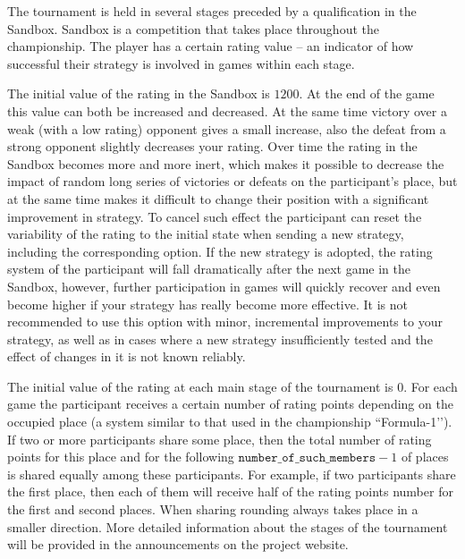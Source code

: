 The tournament is held in several stages preceded by a qualification in the Sandbox.
Sandbox is a competition that takes place throughout the championship.
The player has a certain rating value -- an indicator of how successful
their strategy is involved in games within each stage.

The initial value of the rating in the Sandbox is $1200$. At the end of the game this value can both be increased and decreased. At the same time victory
over a weak (with a low rating) opponent gives a small increase, also the defeat from a strong opponent slightly decreases your
rating. Over time the rating in the Sandbox becomes more and more inert, which makes it possible to decrease the impact of random long series of victories or
defeats on the participant's place, but at the same time makes it difficult to change their position with a significant improvement in strategy. To cancel such effect
the participant can reset the variability of the rating to the initial state when sending a new strategy, including the corresponding
option. If the new strategy is adopted, the rating system of the participant will fall dramatically after the next game in the Sandbox, however,
further participation in games will quickly recover and even become higher if your strategy has really become more effective. It is not recommended
to use this option with minor, incremental improvements to your strategy, as well as in cases where a new strategy
insufficiently tested and the effect of changes in it is not known reliably.

The initial value of the rating at each main stage of the tournament is $0$. For each game the participant receives a certain number of rating points
depending on the occupied place (a system similar to that used in the championship ``Formula-1’’). If two or more participants share
some place, then the total number of rating points for this place and for the following $\texttt{number\_of\_such\_members}-1$ of places is shared
equally among these participants. For example, if two participants share the first place, then each of them will receive half of the rating points number
for the first and second places. When sharing rounding always takes place in a smaller direction. More detailed information about the stages of the tournament will be
provided in the announcements on the project website.

